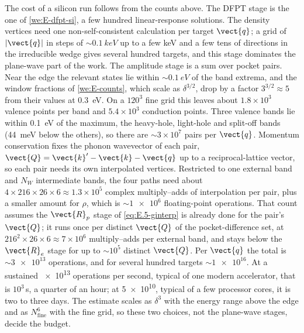 The cost of a silicon run follows from the counts above. The DFPT stage is the one of \cref{we:E-dfpt-si}, a few hundred linear-response solutions. The density vertices need one non-self-consistent calculation per target $\vect{q}$; a grid of $|\vect{q}|$ in steps of $\sim\SI{0.1}{keV}$ up to a few keV and a few tens of directions in the irreducible wedge gives several hundred targets, and this stage dominates the plane-wave part of the work. The amplitude stage is a sum over pocket pairs. Near the edge the relevant states lie within $\sim\SI{0.1}{eV}$ of the band extrema, and the window fractions of \cref{we:E-counts}, which scale as $\delta^{3/2}$, drop by a factor $3^{3/2} \approx 5$ from their values at \SI{0.3}{eV}. On a $120^3$ fine grid this leaves about $1.8\times10^3$ valence points per band and $5.4\times10^3$ conduction points. Three valence bands lie within \SI{0.1}{eV} of the maximum, the heavy-hole, light-hole and split-off bands (\SI{44}{meV} below the others), so there are $\sim3\times10^7$ pairs per $\vect{q}$. Momentum conservation fixes the phonon wavevector of each pair, $\vect{Q} = \vect{k}' - \vect{k} - \vect{q}$ up to a reciprocal-lattice vector, so each pair needs its own interpolated vertices. Restricted to one external band and $N_W$ intermediate bands, the four paths need about $4\times216\times26\times6 \approx 1.3\times10^5$ complex multiply--adds of interpolation per pair, plus a smaller amount for $\rho$, which is $\sim\num{1e6}$ floating-point operations. That count assumes the $\vect{R}_p$ stage of \cref{eq:E.5-ginterp} is already done for the pair's $\vect{Q}$; it runs once per distinct $\vect{Q}$ of the pocket-difference set, at $216^2\times26\times6 \approx 7\times10^6$ multiply--adds per external band, and stays below the $\vect{R}_e$ stage for up to $\sim10^5$ distinct $\vect{Q}$. Per $\vect{q}$ the total is $\sim\num{3e13}$ operations, and for several hundred targets $\sim\num{1e16}$. At a sustained \num{e13} operations per second, typical of one modern accelerator, that is $10^3$\,s, a quarter of an hour; at \num{5e10}, typical of a few processor cores, it is two to three days. The estimate scales as $\delta^{3}$ with the energy range above the edge and as $N_{\mathrm{fine}}^6$ with the fine grid, so these two choices, not the plane-wave stages, decide the budget.
